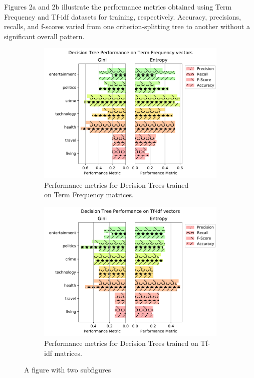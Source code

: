 \documentclass[11pt]{article}
\begin{document}
Figures 2a and 2b illustrate the performance metrics obtained using Term Frequency and Tf-idf datasets for training, respectively.
Accuracy, precisions, recalls, and f-scores varied from one criterion-splitting tree to another without a significant overall pattern.

\begin{figure}[h!] \label{fig:perftf_decisiontree}
	\centering
	\begin{subfigure}{.5\textwidth}
	  \centering
	  \includegraphics[width=\linewidth]{figures/decision_tree/tf_prec_n_rec}
	  \caption{Performance metrics for Decision Trees trained \\
	  on Term Frequency matrices.}
	  \label{fig:sub1}
	\end{subfigure}%
	\begin{subfigure}{.5\textwidth}
	  \centering
	  \includegraphics[width=\linewidth]{figures/decision_tree/tfidf_prec_n_rec}
	  \caption{Performance metrics for Decision Trees trained on Tf-idf matrices.}
	  \label{fig:sub2}
	\end{subfigure}
	\caption{A figure with two subfigures}
\end{figure}
\end{document}
